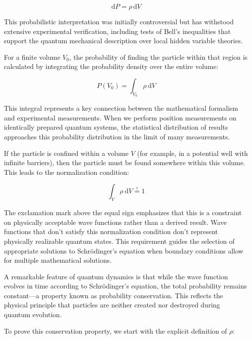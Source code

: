 \documentclass[10pt]{article}
\begin{document}
\begin{equation*}
\mathrm{d}P=\rho\,\mathrm{d}V \tag{1.24}
\end{equation*}

This probabilistic interpretation was initially controversial but has withstood extensive experimental verification, including tests of Bell's inequalities that support the quantum mechanical description over local hidden variable theories.

For a finite volume $V_{0}$, the probability of finding the particle within that region is calculated by integrating the probability density over the entire volume:

\begin{equation*}
P\left(V_{0}\right)=\int_{V_{0}} \rho \mathrm{~d} V \tag{1.25}
\end{equation*}

This integral represents a key connection between the mathematical formalism and experimental measurements. When we perform position measurements on identically prepared quantum systems, the statistical distribution of results approaches this probability distribution in the limit of many measurements.

If the particle is confined within a volume $V$ (for example, in a potential well with infinite barriers), then the particle must be found somewhere within this volume. This leads to the normalization condition:

\begin{equation*}
\int_{V} \rho \mathrm{~d} V \stackrel{!}{=} 1 \tag{1.26}
\end{equation*}

The exclamation mark above the equal sign emphasizes that this is a constraint on physically acceptable wave functions rather than a derived result. Wave functions that don't satisfy this normalization condition don't represent physically realizable quantum states. This requirement guides the selection of appropriate solutions to Schrödinger's equation when boundary conditions allow for multiple mathematical solutions.

A remarkable feature of quantum dynamics is that while the wave function evolves in time according to Schrödinger's equation, the total probability remains constant—a property known as probability conservation. This reflects the physical principle that particles are neither created nor destroyed during quantum evolution.

To prove this conservation property, we start with the explicit definition of $\rho$:
\end{document}
